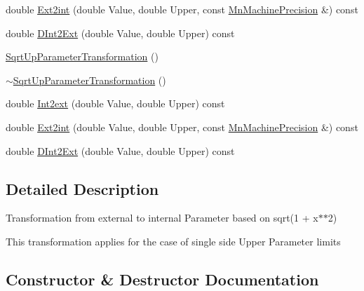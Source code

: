 \begin{DoxyCompactItemize}
\item 
double \mbox{\hyperlink{classROOT_1_1Minuit2_1_1SqrtUpParameterTransformation_a8ba129e1707b752df2b477c5e8459958}{Ext2int}} (double Value, double Upper, const \mbox{\hyperlink{classROOT_1_1Minuit2_1_1MnMachinePrecision}{Mn\+Machine\+Precision}} \&) const
\item 
double \mbox{\hyperlink{classROOT_1_1Minuit2_1_1SqrtUpParameterTransformation_a82e3860242c4f0d7a81dabef95803bd1}{D\+Int2\+Ext}} (double Value, double Upper) const
\item 
\mbox{\hyperlink{classROOT_1_1Minuit2_1_1SqrtUpParameterTransformation_a80ef735d8397fb4b24b6c31b422efa29}{Sqrt\+Up\+Parameter\+Transformation}} ()
\item 
\mbox{\hyperlink{classROOT_1_1Minuit2_1_1SqrtUpParameterTransformation_aca319b673b2b9abd5493c318dcb4c6d2}{$\sim$\+Sqrt\+Up\+Parameter\+Transformation}} ()
\item 
double \mbox{\hyperlink{classROOT_1_1Minuit2_1_1SqrtUpParameterTransformation_afd65e37e7e03cb9db5bf9906eb399fc8}{Int2ext}} (double Value, double Upper) const
\item 
double \mbox{\hyperlink{classROOT_1_1Minuit2_1_1SqrtUpParameterTransformation_a8ba129e1707b752df2b477c5e8459958}{Ext2int}} (double Value, double Upper, const \mbox{\hyperlink{classROOT_1_1Minuit2_1_1MnMachinePrecision}{Mn\+Machine\+Precision}} \&) const
\item 
double \mbox{\hyperlink{classROOT_1_1Minuit2_1_1SqrtUpParameterTransformation_a82e3860242c4f0d7a81dabef95803bd1}{D\+Int2\+Ext}} (double Value, double Upper) const
\end{DoxyCompactItemize}


\subsection{Detailed Description}
Transformation from external to internal Parameter based on sqrt(1 + x$\ast$$\ast$2)

This transformation applies for the case of single side Upper Parameter limits 

\subsection{Constructor \& Destructor Documentation}
\mbox{\label{classROOT_1_1Minuit2_1_1SqrtUpParameterTransformation_a80ef735d8397fb4b24b6c31b422efa29}} 
